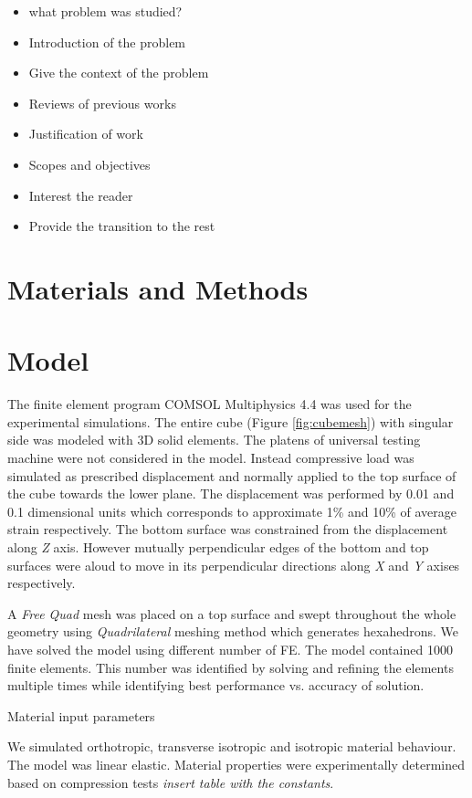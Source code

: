\documentclass[review]{elsarticle}
\begin{document}
\begin{itemize}
\color{red}  



\item what problem was studied?
\item Introduction of the problem
\item Give the context of the problem
\item Reviews of previous works
\item Justification of work
\item Scopes and objectives
\item Interest the reader
\item Provide the transition to the rest
\end{itemize}

\section{Materials and Methods}
\section{Model}

The finite element program COMSOL Multiphysics 4.4 \cite{Comsol} was used for
the experimental simulations.
The entire cube (Figure \ref{fig:cubemesh})  with singular side was modeled with
3D solid elements.
The platens of universal testing machine were not considered in the model.
Instead compressive load was simulated as prescribed displacement and normally
applied to the top surface of the cube towards the lower plane. The
displacement was performed by 0.01 and 0.1 dimensional units which corresponds
to approximate 1\%  and 10\% of average strain respectively. The bottom surface
was constrained from the displacement along \textit{Z} axis. However mutually perpendicular edges of the bottom and top surfaces were aloud to move in its perpendicular directions along \textit{X} and \textit{Y} axises respectively.

A \textit{Free Quad} mesh was placed on a top surface and swept throughout
the whole geometry using \textit{Quadrilateral} meshing method which generates
hexahedrons. We have solved the model using different number of FE. The model
contained 1000 finite elements. This number was identified by solving and
refining the elements multiple times while identifying best performance vs.
accuracy of solution. 

\begin{description}
\item[{\color {red}Material input parameters}]
\end{description}
We simulated orthotropic, transverse isotropic and isotropic material behaviour.
The model was linear elastic. Material properties were experimentally determined
based on compression tests \textit{insert table with the constants}.  
\end{document}
